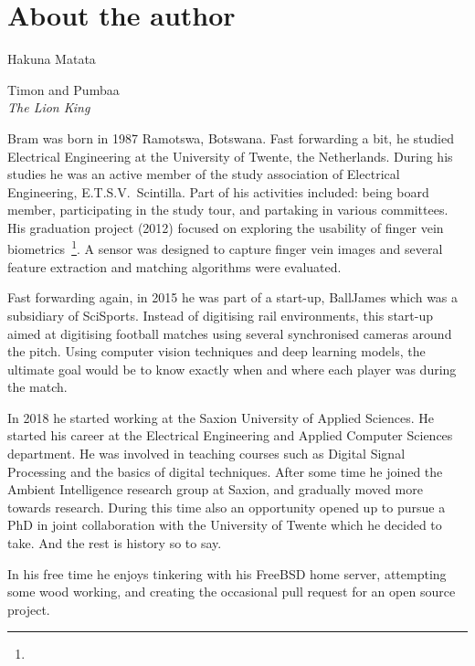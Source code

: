 \chapter{About the author}
\epigraph{Hakuna Matata}{Timon and Pumbaa\\\textit{The Lion King}}

Bram was born in 1987 Ramotswa, Botswana. Fast forwarding a bit, he studied Electrical Engineering at the University of Twente, the Netherlands. During his studies he was an active member of the study association of Electrical Engineering, E.T.S.V.~Scintilla. Part of his activities included: being board member, participating in the study tour, and partaking in various committees. His graduation project (2012) focused on exploring the usability of finger vein biometrics~\footnote{}. A sensor was designed to capture finger vein images and several feature extraction and matching algorithms were evaluated.

Fast forwarding again, in 2015 he was part of a start-up, BallJames which was a subsidiary of SciSports. Instead of digitising rail environments, this start-up aimed at digitising football matches using several synchronised cameras around the pitch. Using computer vision techniques and deep learning models, the ultimate goal would be to know exactly when and where each player was during the match.

In 2018 he started working at the Saxion University of Applied Sciences. He started his career at the Electrical Engineering and Applied Computer Sciences department. He was involved in teaching courses such as Digital Signal Processing and the basics of digital techniques. After some time he joined the Ambient Intelligence research group at Saxion, and gradually moved more towards research. During this time also an opportunity opened up to pursue a PhD in joint collaboration with the University of Twente which he decided to take. And the rest is history so to say.

In his free time he enjoys tinkering with his FreeBSD home server, attempting some wood working, and creating the occasional pull request for an open source project.
